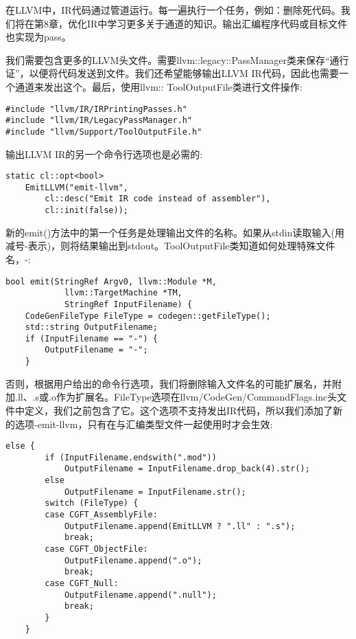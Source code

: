 在LLVM中，IR代码通过管道运行。每一遍执行一个任务，例如：删除死代码。我们将在第8章，优化IR中学习更多关于通道的知识。输出汇编程序代码或目标文件也实现为pass。\par

我们需要包含更多的LLVM头文件。需要llvm::legacy::PassManager类来保存“通行证”，以便将代码发送到文件。我们还希望能够输出LLVM IR代码，因此也需要一个通道来发出这个。最后，使用llvm:: ToolOutputFile类进行文件操作:\par

\begin{lstlisting}[caption={}]
#include "llvm/IR/IRPrintingPasses.h"
#include "llvm/IR/LegacyPassManager.h"
#include "llvm/Support/ToolOutputFile.h"
\end{lstlisting}

输出LLVM IR的另一个命令行选项也是必需的:\par

\begin{lstlisting}[caption={}]
static cl::opt<bool>
	EmitLLVM("emit-llvm",
		cl::desc("Emit IR code instead of assembler"),
		cl::init(false));
\end{lstlisting}

新的emit()方法中的第一个任务是处理输出文件的名称。如果从stdin读取输入(用减号-表示)，则将结果输出到stdout。ToolOutputFile类知道如何处理特殊文件名，-:\par

\begin{lstlisting}[caption={}]
bool emit(StringRef Argv0, llvm::Module *M,
			llvm::TargetMachine *TM,
			StringRef InputFilename) {
	CodeGenFileType FileType = codegen::getFileType();
	std::string OutputFilename;
	if (InputFilename == "-") {
		OutputFilename = "-";
	}
\end{lstlisting}

否则，根据用户给出的命令行选项，我们将删除输入文件名的可能扩展名，并附加.ll、.s或.o作为扩展名。FileType选项在llvm/CodeGen/CommandFlags.inc头文件中定义，我们之前包含了它。这个选项不支持发出IR代码，所以我们添加了新的选项-emit-llvm，只有在与汇编类型文件一起使用时才会生效:\par

\begin{lstlisting}[caption={}]
	else {
		if (InputFilename.endswith(".mod"))
			OutputFilename = InputFilename.drop_back(4).str();
		else
			OutputFilename = InputFilename.str();
		switch (FileType) {
		case CGFT_AssemblyFile:
			OutputFilename.append(EmitLLVM ? ".ll" : ".s");
			break;
		case CGFT_ObjectFile:
			OutputFilename.append(".o");
			break;
		case CGFT_Null:
			OutputFilename.append(".null");
			break;
		}
	}
\end{lstlisting}

